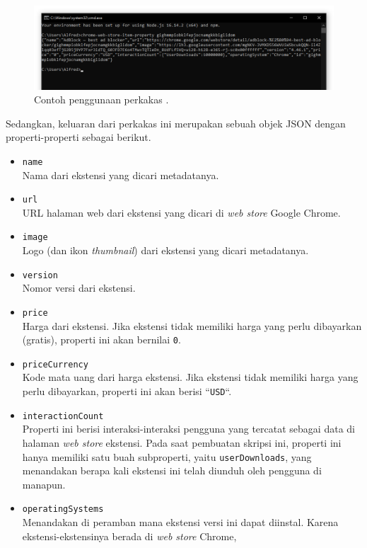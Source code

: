 \documentclass[a4paper,twoside]{article}
\begin{document}
\begin{enumerate}
\begin{figure}[ht]
    \centering
    \includegraphics[width=0.75\linewidth]{chromewebstorecli}
    \caption[Contoh penggunaan perkakas \chromewebstorecli]{Contoh penggunaan perkakas \chromewebstorecli.}
    \label{fig:similarapps-chromewebstorecli}
\end{figure}

Sedangkan, keluaran dari perkakas ini merupakan sebuah objek JSON dengan properti-properti sebagai berikut.

\begin{itemize}
	\item \verb|name|\\
	Nama dari ekstensi yang dicari metadatanya.
	\item \verb|url|\\
	URL halaman web dari ekstensi yang dicari di \textit{web store} Google Chrome.
	\item \verb|image|\\
	Logo (dan ikon \textit{thumbnail}) dari ekstensi yang dicari metadatanya.
	\item \verb|version|\\
	Nomor versi dari ekstensi.
	\item \verb|price|\\
	Harga dari ekstensi. Jika ekstensi tidak memiliki harga yang perlu dibayarkan (gratis), properti ini akan bernilai \verb|0|.
	\item \verb|priceCurrency|\\
	Kode mata uang dari harga ekstensi. Jika ekstensi tidak memiliki harga yang perlu dibayarkan, properti ini akan berisi ``\verb|USD|``.
	\item \verb|interactionCount|\\
	Properti ini berisi interaksi-interaksi pengguna yang tercatat sebagai data di halaman \textit{web store} ekstensi. Pada saat pembuatan skripsi ini, properti ini hanya memiliki satu buah subproperti, yaitu \verb|userDownloads|, yang menandakan berapa kali ekstensi ini telah diunduh oleh pengguna di manapun.
	\item \verb|operatingSystems|\\
	Menandakan di peramban mana ekstensi versi ini dapat diinstal. Karena ekstensi-ekstensinya berada di \textit{web store} Chrome,

\end{itemize}
\end{enumerate}
\end{document}
